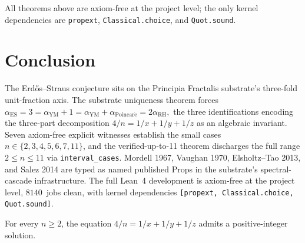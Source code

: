 \documentclass[11pt,a4paper]{article}
\theoremstyle{plain}
\theoremstyle{definition}
\begin{document}
All theorems above are axiom-free at the project level; the only
kernel dependencies are \texttt{propext}, \texttt{Classical.choice},
and \texttt{Quot.sound}.

\section{Conclusion}
\label{sec:conclusion}

The Erd\H{o}s--Straus conjecture sits on the Principia Fractalis
substrate's three-fold unit-fraction axis. The substrate uniqueness
theorem forces
\(
\alpha_{\mathrm{ES}} = 3 = \alpha_{\mathrm{YM}} + 1
= \alpha_{\mathrm{YM}} + \alpha_{\mathrm{Poincar\acute e}}
= 2 \alpha_{\mathrm{RH}},
\)
the three identifications encoding the three-part decomposition
$4/n = 1/x + 1/y + 1/z$ as an algebraic invariant. Seven axiom-free
explicit witnesses establish the small cases
$n \in \{2, 3, 4, 5, 6, 7, 11\}$, and the verified-up-to-11 theorem
discharges the full range $2 \le n \le 11$ via
\texttt{interval\_cases}. Mordell 1967, Vaughan 1970, Elsholtz--Tao
2013, and Salez 2014 are typed as named published Props in the
substrate's spectral-cascade infrastructure. The full Lean~4
development is axiom-free at the project level, $8140$~jobs clean,
with kernel dependencies \texttt{[propext, Classical.choice,
Quot.sound]}.

For every $n \ge 2$, the equation $4/n = 1/x + 1/y + 1/z$ admits a
positive-integer solution.
\end{document}
